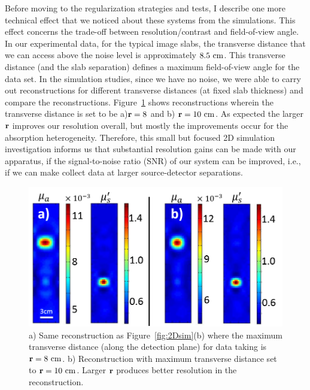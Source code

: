 Before moving to the regularization strategies and tests, I describe one more technical effect that we noticed about these systems from the simulations. This effect concerns the trade-off between resolution/contrast and field-of-view angle. In our experimental data, for the typical image slabs, the transverse distance that we can access above the noise level is approximately $8.5~\rm{cm}$. This transverse distance (and the slab separation) defines a maximum field-of-view angle for the data set. In the simulation studies, since we have no noise, we were able to carry out reconstructions for different transverse distances (at fixed slab thickness) and compare the reconstructions. Figure~\ref{fig:2Dfanbeam} shows reconstructions wherein the transverse distance is set to be a)$\mathbf{r}=8$ and b) $\mathbf{r}=10~\rm{cm}$. As expected the larger $\mathbf{r}$ improves our resolution overall, but mostly the improvements occur for the absorption heterogeneity. Therefore, this small but focused 2D simulation investigation informs us that substantial resolution gains can be made with our apparatus, if the signal-to-noise ratio (SNR) of our system can be improved, i.e., if we can make collect data at larger source-detector separations.
\begin{figure}[t]
\begin{center}
\includegraphics[width=13cm]{./figures/4_Gen3/2Dfanbeam.png}
\caption[Comparison of simulation reconstructions with different maximum transverse distances]{a) Same reconstruction as Figure~\ref{fig:2Dsim}(b) where the maximum transverse distance (along the detection plane) for data taking is $\mathbf{r}=8~\rm{cm}$. b) Reconstruction with maximum transverse distance set to $\mathbf{r}=10~\rm{cm}$. Larger $\mathbf{r}$ produces better resolution in the reconstruction.}
\label{fig:2Dfanbeam}
\end{center}
\end{figure}

